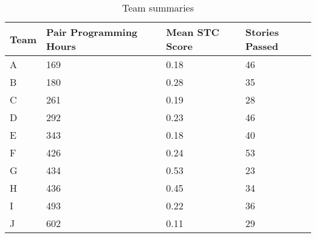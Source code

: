 \begin{table}
    \caption{Team summaries}
    \begin{center}
        \label{tbl:team_stats}
        \begin{tabular}{| p{} | p{} | p{} | p{} |} 
            \hline 
            \textbf{Team}&\textbf{Pair Programming Hours}&\textbf{Mean STC Score}&\textbf{Stories Passed}
            \\ \hline
            A & 169 & 0.18 & 46
            \\ \hline
            B & 180 & 0.28 & 35
            \\ \hline
            C & 261 & 0.19 & 28
            \\ \hline
            D & 292 & 0.23 & 46
            \\ \hline
            E & 343 & 0.18 & 40
            \\ \hline
            F & 426 & 0.24 & 53
            \\ \hline
            G & 434 & 0.53 & 23
            \\ \hline
            H & 436 & 0.45 & 34
            \\ \hline
            I & 493 & 0.22 & 36
            \\ \hline
            J & 602 & 0.11 & 29
            \\ \hline
        \end{tabular}
    \end{center}
\end{table}
